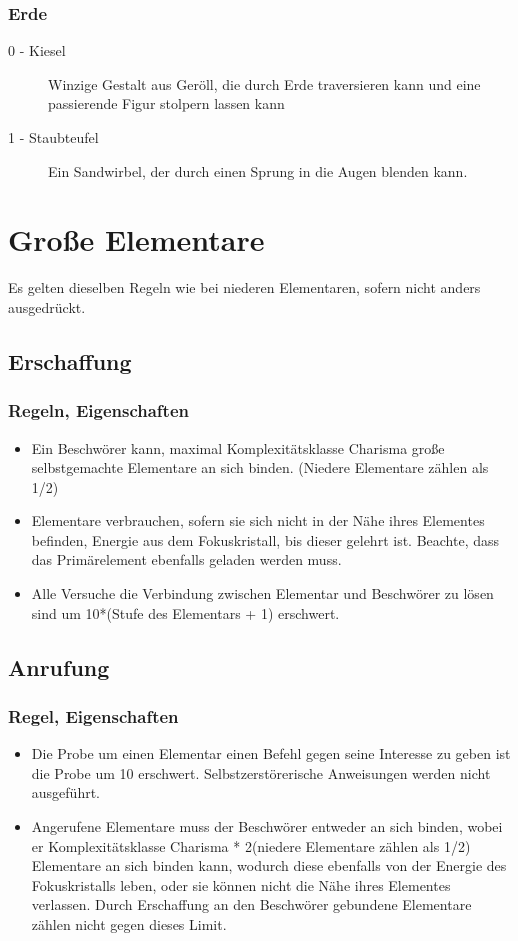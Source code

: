 \documentclass[a4paper,12pt,oneside]{book}
\begin{document}
\subsection{Erde}
\begin{description} 
\item[0 - Kiesel]Winzige Gestalt aus Geröll, die durch Erde traversieren kann und eine passierende Figur stolpern lassen kann 
\item[1 - Staubteufel]Ein Sandwirbel, der durch einen Sprung in die Augen blenden kann.
\end{description}


\chapter{Große Elementare}
Es gelten dieselben Regeln wie bei niederen Elementaren, sofern nicht anders ausgedrückt.
\section{Erschaffung}
\subsection{Regeln, Eigenschaften}
\begin{itemize}
\item Ein Beschwörer kann, maximal Komplexitätsklasse Charisma große selbstgemachte Elementare an sich binden. (Niedere Elementare zählen als 1/2)
\item Elementare verbrauchen, sofern sie sich nicht in der Nähe ihres Elementes befinden, Energie aus dem Fokuskristall, bis dieser gelehrt ist. Beachte, dass das Primärelement ebenfalls geladen werden muss.
\item Alle Versuche die Verbindung zwischen Elementar und Beschwörer zu lösen sind um 10*(Stufe des Elementars + 1) erschwert. 
\end{itemize}
\section{Anrufung}
\subsection{Regel, Eigenschaften}
\begin{itemize}
\item Die Probe um einen Elementar einen Befehl gegen seine Interesse zu geben ist die Probe um 10 erschwert. Selbstzerstörerische Anweisungen werden nicht ausgeführt. 
\item Angerufene Elementare muss der Beschwörer entweder an sich binden, wobei er Komplexitätsklasse Charisma * 2(niedere Elementare zählen als 1/2) Elementare an sich binden kann, wodurch diese ebenfalls von der Energie des Fokuskristalls leben, oder sie können nicht die Nähe ihres Elementes verlassen. Durch Erschaffung an den Beschwörer gebundene Elementare zählen nicht gegen dieses Limit. 
\end{itemize}
\end{document}
